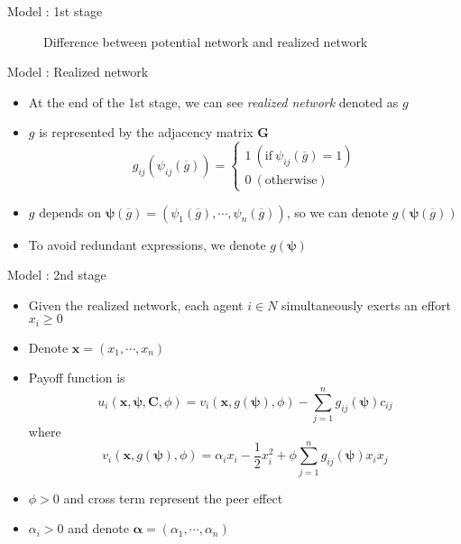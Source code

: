 \documentclass[10pt,dvipdfmx]{beamer}
\begin{document}
\begin{frame}{Model : 1st stage}
\begin{figure}[h]
{}
\caption{Difference between potential network and realized network}
\end{figure}
\end{frame}

\begin{frame}{Model : Realized network}
\begin{itemize}
    \item At the end of the 1st stage, we can see {\it{realized network}} denoted as $g$
    \item $g$ is represented by the adjacency matrix $\bm{G}$
    \[ g_{ij}(\psi_{ij}(\overline{g})) = 
        \begin{cases}
            1 \  (\text{if} \  \psi_{ij}(\overline{g}) = 1 ) \\
            0 \  (\text{otherwise})
        \end{cases} \]
    \item $g$ depends on $\bm{\psi}(\overline{g}) = (\psi_1(\overline{g}), \cdots, \psi_n(\overline{g}))$, so we can denote $g(\bm{\psi}(\overline{g}))$
    \item To avoid redundant expressions, we denote $g(\bm{\psi})$
\end{itemize}
\end{frame}

\begin{frame}{Model : 2nd stage}
\begin{itemize}
    \item Given the realized network, each agent $i \in N$ simultaneously exerts an effort $x_i \ge 0$
    \item Denote $\bm{x} = (x_1, \cdots, x_n)$
    \item Payoff function is
        \[ u_i(\bm{x}, \bm{\psi}, \bm{C}, \phi) = v_i(\bm{x}, g(\bm{\psi}), \phi) - \sum_{j=1}^n g_{ij}(\bm{\psi}) c_{ij} \]
        where
        \[ v_i(\bm{x}, g(\bm{\psi}), \phi) = \alpha_i x_i - \frac{1}{2} x_i^2 + \phi \sum_{j=1}^n g_{ij}(\bm{\psi}) x_i x_j \]
    \item $\phi > 0$ and cross term represent the peer effect
    \item $\alpha_i > 0$ and denote $\bm{\alpha} = (\alpha_1, \cdots, \alpha_n)$
\end{itemize}
\end{frame}
\end{document}
